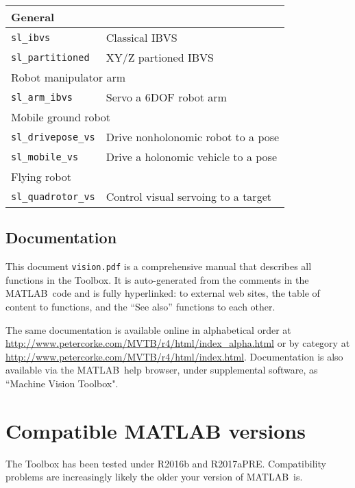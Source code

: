 \documentclass[a4paper,twoside]{report}
\def\Mlab{MATLAB}
\begin{document}
\begin{center}
\begin{tabular}{|l|l|}\hline
\multicolumn{2}{|l|}{General} \\\hline
\texttt{sl\_ibvs} & Classical IBVS \\
\texttt{sl\_partitioned} &  XY/Z partioned IBVS \\\hline\hline
\multicolumn{2}{|l|}{Robot manipulator arm} \\\hline
\texttt{sl\_arm\_ibvs} &  Servo a 6DOF robot arm\\\hline\hline
\multicolumn{2}{|l|}{Mobile ground robot} \\\hline
\texttt{sl\_drivepose\_vs} &  Drive nonholonomic robot to a pose\\
\texttt{sl\_mobile\_vs} &  Drive a holonomic vehicle to a pose\\\hline\hline
\multicolumn{2}{|l|}{Flying robot} \\\hline
\texttt{sl\_quadrotor\_vs} &  Control visual servoing to a target\\ \hline
\end{tabular}
\end{center}


\subsection{Documentation}
This document {\tt vision.pdf} is a comprehensive manual that describes all functions in the Toolbox.
It is auto-generated from the comments in the \Mlab\ code and is fully hyperlinked:
to external web sites, the table of content to functions, and the ``See also'' functions
to each other.

The same documentation is available online in
alphabetical order at \url{http://www.petercorke.com/MVTB/r4/html/index_alpha.html}
or by category at \url{http://www.petercorke.com/MVTB/r4/html/index.html}.
Documentation is also available via the \Mlab\ help browser,  under supplemental software, as ``Machine Vision
Toolbox".


\section{Compatible MATLAB versions}
The Toolbox has been tested under R2016b and R2017aPRE.  Compatibility problems are increasingly likely the older your version of \Mlab\ is.
\end{document}
